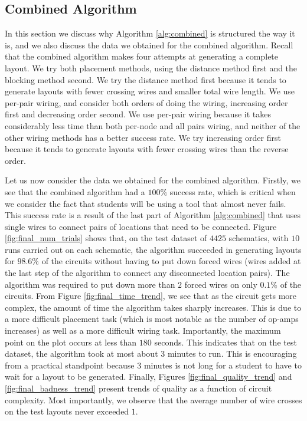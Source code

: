 \subsection{Combined Algorithm}
\label{sec:method_combination}

In this section we discuss why Algorithm
\ref{alg:combined} is structured the way it is, and we also
discuss the data we obtained for the combined algorithm. Recall that the combined
algorithm makes four attempts at generating a complete layout. We try both
placement methods, using the distance method first and the blocking method
second. We
try the distance method first because it tends to generate layouts with fewer
crossing wires and smaller total wire length. We use per-pair wiring, and
consider both orders of doing the wiring, increasing order first and decreasing
order second. We use per-pair wiring because it takes considerably
less time than both per-node and all pairs wiring, and neither of the other
wiring methods has a better success rate. We try increasing order first because
it tends to generate layouts with fewer crossing wires than the reverse order.

Let us now consider the data we obtained for the combined algorithm. Firstly, we
see that the combined algorithm had a $100\%$ success rate, which is critical
when we consider the fact that students will be using a tool that almost never
fails. This success rate is a result of the last part of Algorithm
\ref{alg:combined} that uses single wires to connect pairs of locations that
need to be connected.
Figure \ref{fig:final_num_trials} shows that, on the test dataset of $4425$
schematics, with $10$ runs carried out on each schematic, the algorithm succeeded
in generating layouts for $98.6\%$ of the circuits without having to put down
forced wires (wires added at the last step of the algorithm to connect any
disconnected location pairs). The algorithm was
required to put down more than $2$ forced wires on only $0.1\%$ of the circuits.
From Figure
\ref{fig:final_time_trend}, we see that as the circuit gets more complex, the
amount of time the algorithm takes sharply increases. This is due to a more
difficult placement task (which is most notable as the number of op-amps
increases) as well as a more
difficult wiring task. Importantly, the maximum
point on the plot occurs at less than $180$ seconds. This indicates that on the
test dataset, the algorithm took at most about $3$ minutes to run. This is
encouraging from a practical standpoint because $3$ minutes is not long
for a student to have to wait for a layout to be generated.
Finally, Figures \ref{fig:final_quality_trend} and \ref{fig:final_badness_trend}
present trends of quality as a
function of circuit complexity. Most importantly, we observe that the average
number of wire crosses on the test layouts never exceeded $1$.

